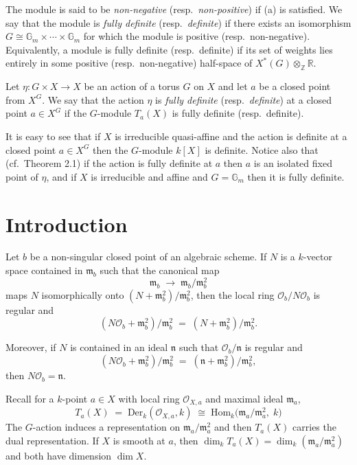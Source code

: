 \documentclass[12pt]{article}
\begin{document}
The module is said to be \emph{non-negative} (resp.\ \emph{non-positive}) 
if (a) is satisfied. We say that the module is \emph{fully definite} 
(resp.\ \emph{definite}) if there exists an isomorphism 
$G \cong \mathbb{G}_m \times \cdots \times \mathbb{G}_m$ for which the 
module is positive (resp.\ non-negative). Equivalently, a module is fully definite (resp.\ definite) if its set of weights lies entirely in some positive (resp.\ non-negative) half-space of $X^*(G)\otimes_\mathbb{Z} \mathbb{R}$.

\medskip

Let $\eta: G \times X \to X$ be an action of a torus $G$ on $X$ and let $a$ 
be a closed point from $X^G$. We say that the action $\eta$ is 
\emph{fully definite} (resp.\ \emph{definite}) at a closed point 
$a \in X^G$ if the $G$-module $T_a(X)$ is fully definite (resp.\ definite).  

It is easy to see that if $X$ is irreducible quasi-affine and the action 
is definite at a closed point $a \in X^G$ then the $G$-module $k[X]$ 
is definite. Notice also that (cf.\ Theorem 2.1) if the action is fully definite 
at $a$ then $a$ is an isolated fixed point of $\eta$, and if $X$ is irreducible 
and affine and $G = \mathbb{G}_m$ then it is fully definite.

\section{Introduction}

\begin{lemma}[2.1]
Let $b$ be a non-singular closed point of an algebraic scheme.  
If $N$ is a $k$-vector space contained in $\mathfrak{m}_b$ such that the canonical map  
\[
   \mathfrak{m}_b \;\longrightarrow\; \mathfrak{m}_b / \mathfrak{m}_b^2
\]
maps $N$ isomorphically onto $(N + \mathfrak{m}_b^2)/\mathfrak{m}_b^2$, then the local ring 
$\mathcal{O}_b / N\mathcal{O}_b$ is regular and
\[
   (N\mathcal{O}_b + \mathfrak{m}_b^2)/\mathfrak{m}_b^2 \;=\; (N + \mathfrak{m}_b^2)/\mathfrak{m}_b^2.
\]

Moreover, if $N$ is contained in an ideal $\mathfrak{n}$ such that $\mathcal{O}_b/\mathfrak{n}$ 
is regular and 
\[
   (N\mathcal{O}_b + \mathfrak{m}_b^2)/\mathfrak{m}_b^2 \;=\; (\mathfrak{n} + \mathfrak{m}_b^2)/\mathfrak{m}_b^2,
\]
then $N\mathcal{O}_b = \mathfrak{n}$.
\end{lemma}

\begin{remark}
    Recall for a $k$-point $a\in X$ with local ring $\mathcal{O}_{X,a}$ and maximal ideal $\mathfrak{m}_a$,
\[T_a(X)\;=\;\mathrm{Der}_k(\mathcal{O}_{X,a},k)\;\cong\;\mathrm{Hom}_k\!\big(\mathfrak{m}_a/\mathfrak{m}_a^2,\;k\big)\]
The $G$-action induces a representation on $\mathfrak{m}_a/\mathfrak{m}_a^2$ and then $T_a(X)$ carries the dual representation. If $X$ is smooth at $a$, then $\dim_k T_a(X)=\dim_k(\mathfrak{m}_a/\mathfrak{m}_a^2)$ and both have dimension $\dim X$.
\end{remark}
\end{document}

